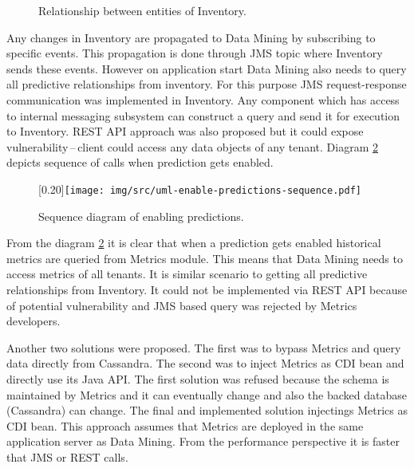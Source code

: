     \begin{figure}[H]
        \begin{center}
            \caption{Relationship between entities of Inventory.}
            \label{img:relationship}
        \end{center}
    \end{figure}

    Any changes in Inventory are propagated to Data Mining by subscribing to specific events. This propagation is done
    through JMS topic where Inventory sends these events. However on application start Data Mining also needs to query
    all predictive relationships from inventory. For this purpose JMS request-response communication was implemented in
    Inventory. Any component which has access to internal messaging subsystem can construct a query and send it for
    execution to Inventory. REST API approach was also proposed but it could expose vulnerability\,--\,client
    could access any data objects of any tenant. Diagram \ref{img:sequence-enab-pred} depicts sequence of calls
    when prediction gets enabled.

    \begin{figure}[H]
        \begin{center}
            \scalebox{0.30}[0.20]{\texttt{[image: img/src/uml-enable-predictions-sequence.pdf]}}
            \caption{Sequence diagram of enabling predictions.}
            \label{img:sequence-enab-pred}
        \end{center}
    \end{figure}

    From the diagram \ref{img:sequence-enab-pred} it is clear that when a prediction gets enabled historical metrics are
    queried from Metrics module. This means that Data Mining needs to access metrics of all tenants. It is
    similar scenario to getting all predictive relationships from Inventory. It could not be implemented via REST API
    because of potential vulnerability and JMS based query was rejected by Metrics developers.

    Another two solutions were proposed. The first was to bypass Metrics and query data directly from Cassandra.
    The second was to inject Metrics as CDI bean and directly use its Java API. The first solution was refused because
    the schema is maintained by Metrics and it can eventually change and also the backed database (Cassandra) can
    change. The final and implemented solution injectings Metrics as CDI bean. This approach assumes that Metrics
    are deployed in the same application server as Data Mining. From the performance perspective it is faster that
    JMS or REST calls.

